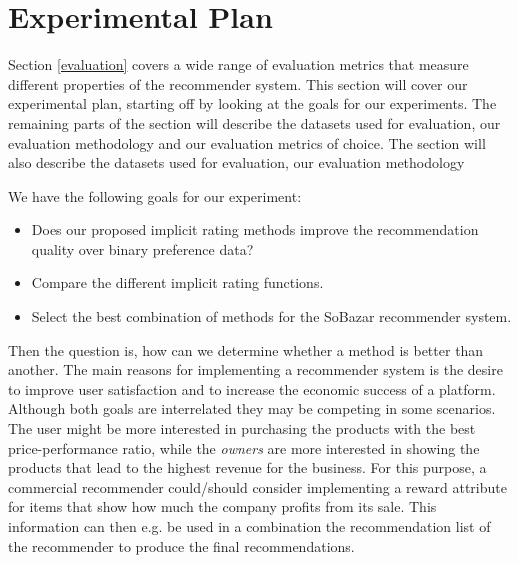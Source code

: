 
\section{Experimental Plan}


Section \ref{evaluation} covers a wide range of evaluation metrics that
measure different properties of the recommender system. This section will cover
our experimental plan, starting off by looking at the goals for our experiments.
The remaining parts of the section will describe the datasets used for evaluation,
our evaluation methodology and our evaluation metrics of choice.
The section will also describe the datasets used for evaluation, our evaluation methodology

We have the following goals for our experiment:

\begin{itemize}
	\item Does our proposed implicit rating methods improve the recommendation quality over
	binary preference data?
	\item Compare the different implicit rating functions.
	\item Select the best combination of methods for the SoBazar recommender system.
\end{itemize}


Then the question is, how can we determine whether a method is better than another. The
main reasons for implementing a recommender system is the desire to improve user
satisfaction and to increase the economic success of a platform. Although both goals
are interrelated they may be competing in some scenarios. The user might be more interested
in purchasing the products with the best price-performance ratio, while the \emph{owners}
are more interested in showing the products that lead to the highest revenue for the
business. For this purpose, a commercial recommender could/should consider implementing
a reward attribute for items that show how much the company profits from its sale. This
information can then e.g. be used in a combination the recommendation list of the recommender
to produce the final recommendations.

